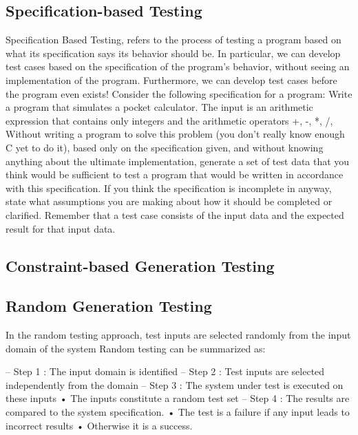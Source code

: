 \documentclass[citeauthoryear]{llncs}
\begin{document}

\subsection{Specification-based Testing}
Specification Based Testing, refers to the process of testing a program based on what its specification says its behavior should be. In particular, we can develop test cases based on the specification of the program's behavior, without seeing an implementation of the program. Furthermore, we can develop test cases before the program even exists!
Consider the following specification for a program:
Write a program that simulates a pocket calculator. The input is an arithmetic expression that contains only integers and the arithmetic operators +, -, *, /, %
Without writing a program to solve this problem (you don't really know enough C yet to do it), based only on the specification given, and without knowing anything about the ultimate implementation, generate a set of test data that you think would be sufficient to test a program that would be written in accordance with this specification. If you think the specification is incomplete in anyway, state what assumptions you are making about how it should be completed or clarified.
Remember that a test case consists of the input data and the expected result for that input data.


\subsection{Constraint-based Generation Testing}

\subsection{Random Generation Testing}
In the random testing approach, test inputs are selected randomly from the input domain of the system
Random testing can be summarized as:

– Step 1 : The input domain is identified
– Step 2 : Test inputs are selected independently from the domain
– Step 3 : The system under test is executed on these inputs
• The inputs constitute a random test set
– Step 4 : The results are compared to the system specification.
• The test is a failure if any input leads to incorrect results
• Otherwise it is a success.
\end{document}
